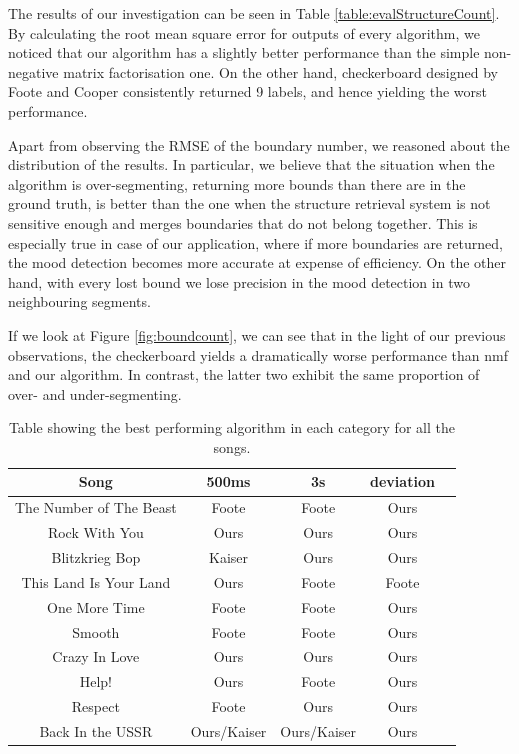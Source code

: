 The results of our investigation can be seen in Table \ref{table:evalStructureCount}. By calculating the root mean square error for outputs of every algorithm, we noticed that our algorithm has a slightly better performance than the simple non-negative matrix factorisation one. On the other hand, checkerboard designed by Foote and Cooper consistently returned 9 labels, and hence yielding the worst performance.

Apart from observing the RMSE of the boundary number, we reasoned about the distribution of the results. In particular, we believe that the situation when the algorithm is over-segmenting, returning more bounds than there are in the ground truth, is better than the one when the structure retrieval system is not sensitive enough and merges boundaries that do not belong together. This is especially true in case of our application, where if more boundaries are returned, the mood detection becomes more accurate at expense of efficiency. On the other hand, with every lost bound we lose precision in the mood detection in two neighbouring segments.

If we look at Figure \ref{fig:boundcount}, we can see that in the light of our previous observations, the checkerboard yields a dramatically worse performance than nmf and our algorithm. In contrast, the latter two exhibit the same proportion of over- and under-segmenting.


\begin{table}
\begin{center}
\begin{tabular}{| c | c | c | c | c | } \hline 
Song  								& 	500ms 			&  3s						&  deviation	\\ \hline \hline
The Number of The Beast 	&	Foote			& 	Foote  				&  Ours 			\\ \hline
Rock With You					&	Ours				&  Ours			  		&  Ours			\\ \hline
Blitzkrieg Bop 					&	Kaiser			&  Ours  				&  Ours 			\\ \hline
This Land Is Your Land 		&	Ours				&  Foote			  	&  Foote 		\\ \hline
One More Time					&	Foote			&  Foote    				&  Ours 			\\ \hline
Smooth								&	Foote			&  Foote  				&  Ours 			\\ \hline
Crazy In Love					&	Ours				&  Ours  				&  Ours  		\\ \hline
Help!									&	Ours				&  Foote		   		&  Ours 			\\ \hline
Respect								&	Foote			&  Ours  				&  Ours 			\\ \hline
Back In the USSR				&	Ours/Kaiser	&  Ours/Kaiser 		&  Ours		    	\\ \hline

\end{tabular}
\caption{Table showing the best performing algorithm in each category for all the songs.}
\label{table:evalStructureRank}
\end{center}
\end{table}


